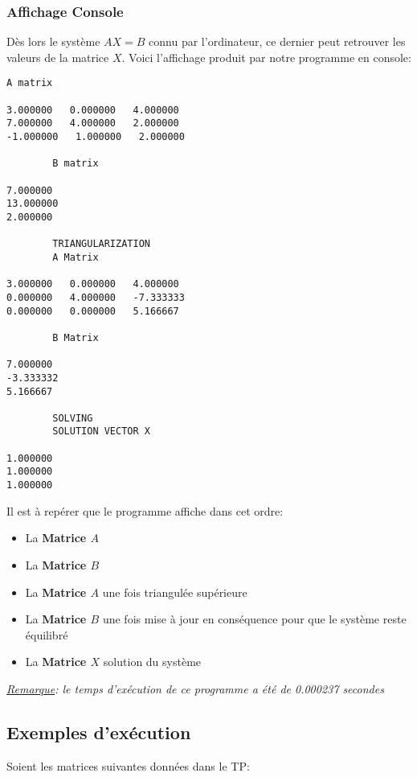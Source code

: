 \subsubsection{Affichage Console}
Dès lors le système $AX=B$ connu par l'ordinateur, ce dernier peut retrouver les valeurs de la matrice $X$. Voici l'affichage produit par notre programme en console: \\
\begin{lstlisting}[caption=Console Display of the Gauss elimination for the AX=B system mentioned above, basicstyle=\fontsize{6}{8}\selectfont]
		A matrix 

3.000000   0.000000   4.000000   
7.000000   4.000000   2.000000   
-1.000000   1.000000   2.000000   

		B matrix 

7.000000   
13.000000   
2.000000   

		TRIANGULARIZATION 
		A Matrix 

3.000000   0.000000   4.000000   
0.000000   4.000000   -7.333333   
0.000000   0.000000   5.166667   

		B Matrix 

7.000000   
-3.333332   
5.166667   

		SOLVING 
		SOLUTION VECTOR X 

1.000000   
1.000000   
1.000000   

\end{lstlisting}
Il est à repérer que le programme affiche dans cet ordre: \\
\begin{itemize}
\item La \textbf{Matrice $A$}
\item La \textbf{Matrice $B$}
\item La \textbf{Matrice $A$} une fois triangulée supérieure
\item La \textbf{Matrice $B$} une fois mise à jour en conséquence pour que le système reste équilibré
\item La \textbf{Matrice $X$} solution du système
\end{itemize}

\textit{\underline{Remarque}: le temps d'exécution de ce programme a été de 0.000237 secondes}
\subsection{Exemples d'exécution}

Soient les matrices suivantes données dans le TP:\\

